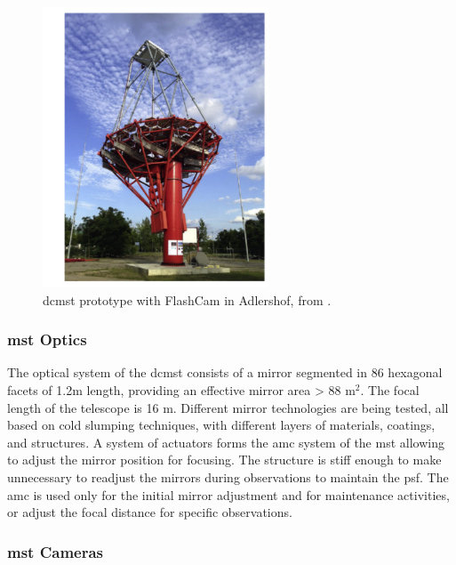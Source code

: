 \documentclass[main.tex]{subfiles}
\begin{document}
\begin{figure}[h]
  \centering
  \includegraphics[width=0.6\textwidth]{Pictures/MST.pdf}
  \caption{\gls{dcmst} prototype with FlashCam in Adlershof, from \cite{2018MSTandLSTstatus}.}
  \label{fig:2MST}
\end{figure}

\subsubsection{\gls{mst} Optics}

The optical system of the \gls{dcmst} consists of a mirror segmented in 86 hexagonal facets of 1.2m length, providing an effective mirror area > 88 m$^2$. The focal length of the telescope is 16 m.
Different mirror technologies are being tested, all based on cold slumping techniques, with different layers of materials, coatings, and structures. A system of actuators forms the \gls{amc} system of the \gls{mst} allowing to adjust the mirror position for focusing. The structure is stiff enough to make unnecessary to readjust the mirrors during observations to maintain the \gls{psf}. The \gls{amc} is used only for the initial mirror adjustment and for maintenance activities, or adjust the focal distance for specific observations.

\subsubsection{\gls{mst} Cameras}
\end{document}
